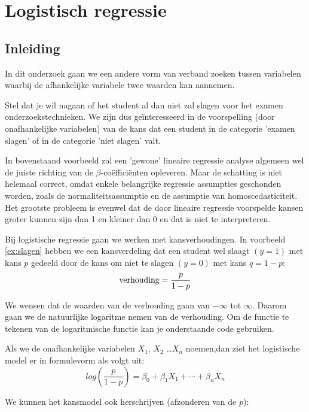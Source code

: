 \chapter{Logistisch regressie}

\section{Inleiding}

In dit onderzoek gaan we een andere vorm van verband zoeken tussen variabelen waarbij de afhankelijke variabele twee waarden kan aannemen. 

\begin{example}
	\label{ex:slagen}
	Stel dat je wil nagaan of het student al dan niet zal slagen voor het examen onderzoekstechnieken. We zijn dus ge\"interesseerd in de voorspelling (door
	onafhankelijke variabelen) van de kans dat een student in de categorie 'examen slagen' of in de categorie 'niet slagen' valt. 
\end{example}

In bovenstaand voorbeeld zal een 'gewone' lineaire regressie analyse 
algemeen wel de juiste richting van de $\beta$-co\"efficiënten opleveren. Maar de schatting is niet helemaal correct, omdat enkele belangrijke regressie assumpties geschonden worden, zoals de normaliteitsassumptie en de assumptie van homoscedasticiteit. Het grootste probleem is evenwel dat de door lineaire regressie voorspelde kansen groter kunnen zijn dan 1 en kleiner dan 0 en dat is niet te interpreteren.

Bij logistische regressie gaan we werken met kansverhoudingen. In voorbeeld \ref{ex:slagen} hebben we een kansverdeling dat een student wel slaagt $(y = 1)$ met kans $p$ gedeeld door de kans om niet te slagen $(y=0)$ met kans $q = 1-p$:
\[ 
	\textnormal{verhouding} = \frac{p}{1-p}
\]

We wensen dat de waarden van de verhouding gaan van $- \infty$ tot $\infty$. Daarom gaan we de natuurlijke logaritme nemen van de verhouding. Om de functie te tekenen van de logaritmische functie kan je onderstaande code gebruiken. 



Als we de onafhankelijke variabelen $X_1$, $X_2$  \dots $X_n$ noemen,dan ziet het logistische model er in formulevorm als volgt uit:
\[ 
	log(\frac{p}{1-p}) = \beta_0 + \beta_1 X_1 + \cdots + \beta_n X_n 
\]

We kunnen het kansmodel ook herschrijven (afzonderen van de $p$):

